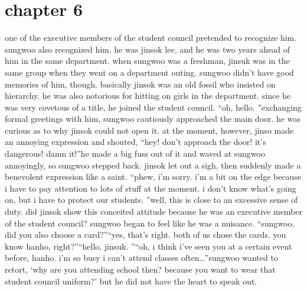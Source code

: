 \section{chapter 6}






one of the executive members of the student council pretended to recognize him.
 sungwoo also recognized him.
 he was jinsok lee, and he was two years ahead of him in the same department.
when sungwoo was a freshman, jinsuk was in the same group when they went on a department outing.
 sungwoo didn’t have good memories of him, though.
basically jinsok was an old fossil who insisted on hierarchy.
 he was also notorious for hitting on girls in the department.
 since he was very covetous of a title, he joined the student council.
“oh, hello.
”exchanging formal greetings with him, sungwoo cautiously approached the main door.
 he was curious as to why jinsok could not open it.
at the moment, however, jinso made an annoying expression and shouted, “hey! don’t approach the door! it’s dangerous! damn it!”he made a big fuss out of it and waved at sungwoo annoyingly, so sungwoo stepped back.
jinsok let out a sigh, then suddenly made a benevolent expression like a saint.
“phew, i’m sorry.
 i’m a bit on the edge because i have to pay attention to lots of stuff at the moment.
 i don’t know what’s going on, but i have to protect our students.
”well, this is close to an excessive sense of duty.
 did jinsok show this conceited attitude because he was an executive member of the student council? sungwoo began to feel like he was a nuisance.
“sungwoo, did you also choose a card?”“yes, that’s right.
 both of us chose the cards.
 you know hanho, right?”“hello, jinsuk.
”“oh, i think i’ve seen you at a certain event before, hanho.
 i’m so busy i can’t attend classes often…”sungwoo wanted to retort, ‘why are you attending school then? because you want to wear that student council uniform?’ but he did not have the heart to speak out.

